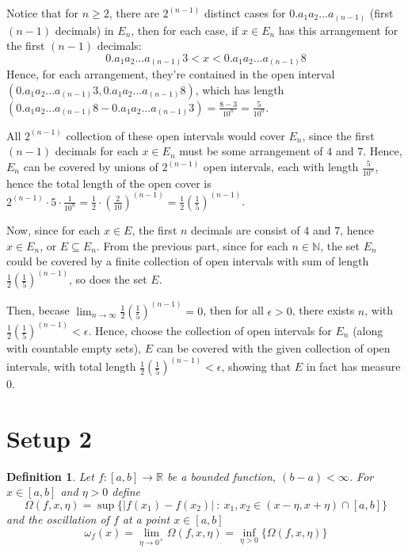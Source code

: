\documentclass{article}
\newtheorem{definition}{Definition}
\begin{document}
Notice that for $n\geq 2$, there are $2^{(n-1)}$ distinct cases for $0.a_1a_2...a_{(n-1)}$ (first $(n-1)$ decimals) in $E_n$, then for each case, if $x\in E_n$ has this arrangement for the first $(n-1)$ decimals:
$$0.a_1a_2...a_{(n-1)}3 < x < 0.a_1a_2...a_{(n-1)}8$$
Hence, for each arrangement, they're contained in the open interval $(0.a_1a_2...a_{(n-1)}3,0.a_1a_2...a_{(n-1)}8)$, which has length
$(0.a_1a_2...a_{(n-1)}8-0.a_1a_2...a_{(n-1)}3)=\frac{8-3}{10^n} = \frac{5}{10^n}$.

All $2^{(n-1)}$ collection of these open intervals would cover $E_n$, since the first $(n-1)$ decimals for each $x\in E_n$ must be some arrangement of $4$ and $7$.
Hence, $E_n$ can be covered by unions of $2^{(n-1)}$ open intervals, each with length $\frac{5}{10^n}$, hence the total length of the open cover is $2^{(n-1)}\cdot 5\cdot \frac{1}{10^n}=\frac{1}{2}\cdot(\frac{2}{10})^{(n-1)}=\frac{1}{2}(\frac{1}{5})^{(n-1)}$.

\hfill

Now, since for each $x\in E$, the first $n$ decimals are consist of $4$ and $7$, hence $x\in E_n$, or $E\subseteq E_n$.
From the previous part, since for each $n\in\mathbb{N}$, the set $E_n$ could be covered by a finite collection of open intervals with sum of length $\frac{1}{2}(\frac{1}{5})^{(n-1)}$, so does the set $E$.

Then, becase $\lim_{n\rightarrow \infty}\frac{1}{2}(\frac{1}{5})^{(n-1)}=0$, then for all $\epsilon>0$, there exists $n$, with $\frac{1}{2}(\frac{1}{5})^{(n-1)}<\epsilon$.
Hence, choose the collection of open intervals for $E_n$ (along with countable empty sets), $E$ can be covered with the given collection of open intervals, with total length $\frac{1}{2}(\frac{1}{5})^{(n-1)}<\epsilon$,
showing that $E$ in fact has measure $0$.

\break

\section*{Setup 2}
\begin{myBox}[]{}
    \begin{definition}
        Let $f : [a, b]\rightarrow \mathbb{R}$ be a bounded function, $(b-a)<\infty$. For $x\in[a,b]$
        and $\eta>0$ define
        $$\Omega(f,x,\eta)=\sup\{|f(x_1)-f(x_2)|\ :\ x_1,x_2\in (x-\eta,x+\eta) \cap [a,b]\}$$
        and the oscillation of $f$ at a point $x\in[a,b]$
        $$\omega_f(x)=\lim_{\eta\rightarrow 0^+}\Omega(f,x,\eta)=\inf_{\eta>0}\{\Omega(f,x,\eta)\}$$
    \end{definition}
\end{myBox}
\end{document}
